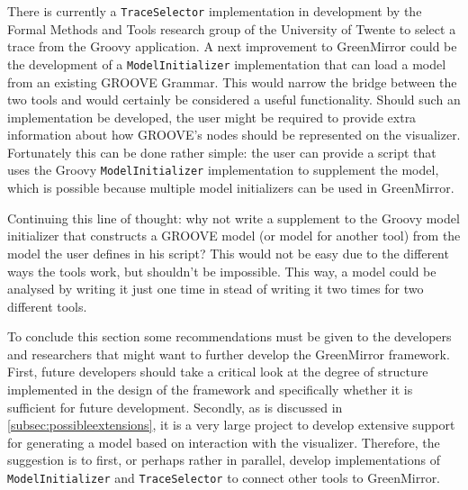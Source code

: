 \documentclass[a4paper]{article}
\begin{document}
There is currently a \lstinline{TraceSelector} implementation in development by the Formal Methods and Tools research group of the University of Twente to select a trace from the Groovy application. A next improvement to GreenMirror could be the development of a \lstinline{ModelInitializer} implementation that can load a model from an existing GROOVE Grammar. This would narrow the bridge between the two tools and would certainly be considered a useful functionality. Should such an implementation be developed, the user might be required to provide extra information about how GROOVE's nodes should be represented on the visualizer. Fortunately this can be done rather simple: the user can provide a script that uses the Groovy \lstinline{ModelInitializer} implementation to supplement the model, which is possible because multiple model initializers can be used in GreenMirror.

Continuing this line of thought: why not write a supplement to the Groovy model initializer that constructs a GROOVE model (or model for another tool) from the model the user defines in his script? This would not be easy due to the different ways the tools work, but shouldn't be impossible. This way, a model could be analysed by writing it just one time in stead of writing it two times for two different tools.

To conclude this section some recommendations must be given to the developers and researchers that might want to further develop the GreenMirror framework. First, future developers should take a critical look at the degree of structure implemented in the design of the framework and specifically whether it is sufficient for future development. Secondly, as is discussed in \cref{subsec:possibleextensions}, it is a very large project to develop extensive support for generating a model based on interaction with the visualizer. Therefore, the suggestion is to first, or perhaps rather in parallel, develop implementations of \lstinline{ModelInitializer} and \lstinline{TraceSelector} to connect other tools to GreenMirror.








\end{document}
